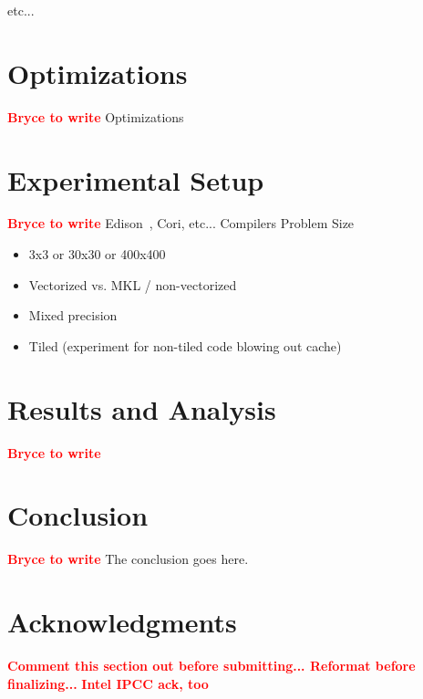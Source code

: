 \documentclass[conference]{IEEEtran}
\newcommand{\fix}[1]{{\bf \textcolor {red}{#1}}}
\begin{document}
etc...

\section{Optimizations}
\fix{Bryce to write}
Optimizations

\section{Experimental Setup}
\fix{Bryce to write}
Edison~\cite{Edison_website}, Cori, etc...
Compilers
Problem Size

\begin{itemize}
\item 3x3 or 30x30 or 400x400
\item Vectorized vs. MKL / non-vectorized
\item Mixed precision
\item Tiled (experiment for non-tiled code blowing out cache)
\end{itemize}

\section{Results and Analysis}
\fix{Bryce to write}

\section{Conclusion}
\fix{Bryce to write}
The conclusion goes here.


\section*{Acknowledgments}
\fix{Comment this section out before submitting... Reformat before finalizing...}
\fix{Intel IPCC ack, too}
\end{document}
